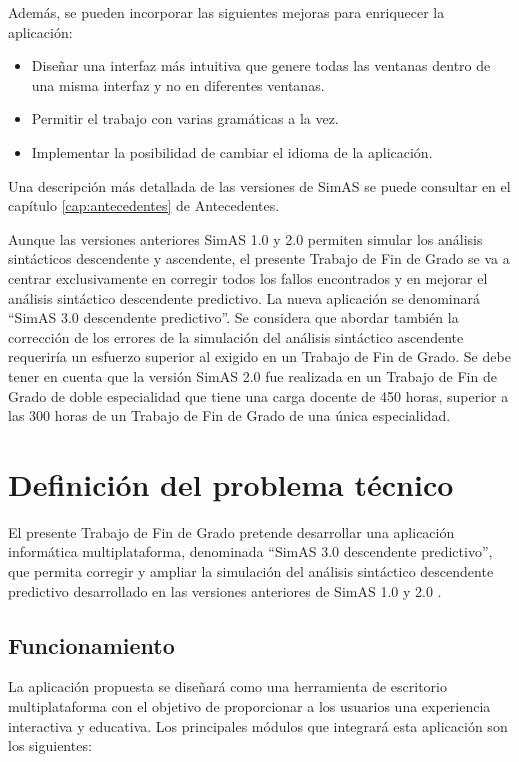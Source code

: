 Además, se pueden incorporar las siguientes mejoras para enriquecer la aplicación:

\begin{itemize}
    \item Diseñar una interfaz más intuitiva que genere todas las ventanas dentro de una misma interfaz y no en diferentes ventanas.
    \item Permitir el trabajo con varias gramáticas a la vez. 
    \item Implementar la posibilidad de cambiar el idioma de la aplicación.
\end{itemize}

Una descripción más detallada de las versiones de SimAS se puede consultar en el capítulo \ref{cap:antecedentes} de Antecedentes.


Aunque las versiones anteriores SimAS 1.0  y 2.0 permiten simular los análisis sintácticos descendente y ascendente, el presente Trabajo de Fin de Grado se va a centrar exclusivamente en corregir todos los fallos encontrados y en mejorar el análisis sintáctico descendente predictivo. La nueva aplicación se denominará ``SimAS 3.0 descendente predictivo''. Se considera que abordar también la corrección de los errores de la simulación del análisis sintáctico ascendente requeriría un esfuerzo superior al exigido en un Trabajo de Fin de Grado. Se debe tener en cuenta que la versión SimAS 2.0 \cite{juan} fue realizada en un Trabajo de Fin de Grado de doble especialidad que tiene una carga docente de 450 horas, superior a las 300 horas de un Trabajo de Fin de Grado de una única especialidad.


\section{Definición del problema técnico}


El presente Trabajo de Fin de Grado pretende desarrollar una aplicación informática multiplataforma, denominada ``SimAS 3.0 descendente predictivo'', que permita corregir y ampliar la simulación del análisis sintáctico descendente predictivo desarrollado en las versiones anteriores de SimAS 1.0 \cite{vanesa} y 2.0 \cite{juan}.

\subsection{Funcionamiento}
La aplicación propuesta se diseñará como una herramienta de escritorio multiplataforma con el objetivo de proporcionar a los usuarios una experiencia interactiva y educativa. Los principales módulos que integrará esta aplicación son los siguientes:

